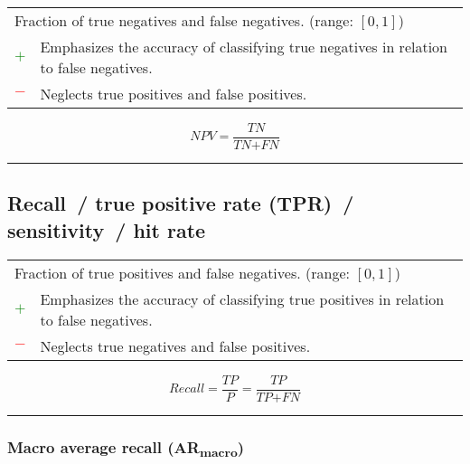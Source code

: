 \documentclass{article}
\begin{document}
\begin{table}[H]\centering
	\begin{tabular}{m{}m{}}
		\multicolumn{2}{m{0.95\textwidth}}{Fraction of true negatives and false negatives. (range: $[0, 1]$)} \\
		\textcolor{Green}{$+$} & Emphasizes the accuracy of classifying true negatives in relation to false negatives. \\
		\textcolor{Red}{$-$}   & Neglects true positives and false positives.
	\end{tabular}
\end{table}

\begin{equation}
	\textit{NPV} = \dfrac{\textit{TN}}{\textit{TN} + \textit{FN}}
%
	\label{equation:NPV}
\end{equation}

\hrule


\subsection[Recall~/ true positive rate (TPR)~/ sensitivity~/ hit rate]{Recall~/ true positive rate (TPR)~/ sensitivity~/ hit rate \cite{yerushalmy1947statistical, altman1994diagnostic}}

\begin{table}[H]\centering
	\begin{tabular}{m{}m{}}
		\multicolumn{2}{m{0.95\textwidth}}{Fraction of true positives and false negatives. (range: $[0, 1]$)} \\
		\textcolor{Green}{$+$} & Emphasizes the accuracy of classifying true positives in relation to false negatives. \\
		\textcolor{Red}{$-$}   & Neglects true negatives and false positives.
	\end{tabular}
\end{table}

\begin{equation}
	\textit{Recall} = \dfrac{\textit{TP}}{\textit{P}} = \dfrac{\textit{TP}}{\textit{TP} + \textit{FN}}
%
	\label{equation:recall}
\end{equation}

\hrule


\subsubsection[Macro average recall (ARmacro)]{Macro average recall (AR\textsubscript{macro}) \cite{yang1999evaluation, sebastiani2002machine, rosenberg2012classifying, yang2020edgernn}}
\end{document}
